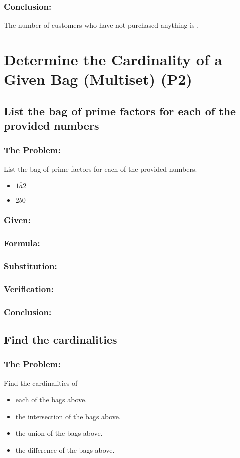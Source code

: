 \documentclass[12pt, a4paper, twoside]{report} %
\begin{document}
\subsubsection*{Conclusion:}
The number of customers who have not purchased anything is .
\section{Determine the Cardinality of a Given Bag (Multiset) (P2)}
\label{sec:P2}
\subsection{List the bag of prime factors for each of the provided numbers}
\subsubsection*{The Problem:}
List the bag of prime factors for each of the provided numbers.
  \begin{itemize}
    \item $\overline{1a2}$
    \item $\overline{2b0}$
  \end{itemize}


\subsubsection*{Given:}
\subsubsection*{Formula:}
\subsubsection*{Substitution:}
\subsubsection*{Verification:}
\subsubsection*{Conclusion:}

\subsection{Find the cardinalities}

\subsubsection*{The Problem:}
Find the cardinalities of
  \begin{itemize}
    \item each of the bags above.
    \item the intersection of the bags above.
    \item the union of the bags above.
    \item the difference of the bags above.
  \end{itemize}
\end{document}
